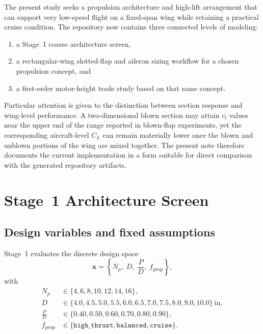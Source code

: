 \documentclass[conf]{new-aiaa}
\begin{document}
The present study seeks a propulsion architecture and high-lift arrangement that can support very low-speed flight on a fixed-span wing while retaining a practical cruise condition. The repository now contains three connected levels of modeling:
\begin{enumerate}
\item a Stage~1 coarse architecture screen,
\item a rectangular-wing slotted-flap and aileron sizing workflow for a chosen propulsion concept, and
\item a first-order motor-height trade study based on that same concept.
\end{enumerate}

Particular attention is given to the distinction between section response and wing-level performance. A two-dimensional blown section may attain \(c_l\) values near the upper end of the range reported in blown-flap experiments, yet the corresponding aircraft-level \(C_L\) can remain materially lower once the blown and unblown portions of the wing are mixed together. The present note therefore documents the current implementation in a form suitable for direct comparison with the generated repository artifacts.

\section{Stage~1 Architecture Screen}

\subsection{Design variables and fixed assumptions}

Stage~1 evaluates the discrete design space
\begin{equation}
\mathbf{x} =
\left\{
N_p,\;
D,\;
\frac{P}{D},\;
f_{\mathrm{prop}}
\right\},
\end{equation}
with
\begin{align}
N_p &\in \{4,6,8,10,12,14,16\}, \\
D &\in \{4.0,4.5,5.0,5.5,6.0,6.5,7.0,7.5,8.0,9.0,10.0\}\ \mathrm{in}, \\
\frac{P}{D} &\in \{0.40,0.50,0.60,0.70,0.80,0.90\}, \\
f_{\mathrm{prop}} &\in \{\texttt{high\_thrust},\texttt{balanced},\texttt{cruise}\}.
\end{align}
\end{document}
